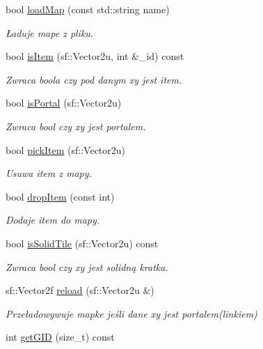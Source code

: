 \begin{DoxyCompactItemize}
\item 
bool \hyperlink{class_tile_map_ac084a4b6aea0e050ec4a8aeea760a515}{load\-Map} (const std\-::string name)
\begin{DoxyCompactList}\small\item\em Ładuje mape z pliku. \end{DoxyCompactList}\item 
bool \hyperlink{class_tile_map_ac5d4d6a3522663052bab1396b1116a89}{is\-Item} (sf\-::\-Vector2u, int \&\-\_\-id) const 
\begin{DoxyCompactList}\small\item\em Zwraca boola czy pod danym xy jest item. \end{DoxyCompactList}\item 
bool \hyperlink{class_tile_map_a9abb261e84ab1ce52d5f2cc6a9c43bbb}{is\-Portal} (sf\-::\-Vector2u)
\begin{DoxyCompactList}\small\item\em Zwraca bool czy xy jest portalem. \end{DoxyCompactList}\item 
bool \hyperlink{class_tile_map_aac072fd241cd09e88a256099055f7238}{pick\-Item} (sf\-::\-Vector2u)
\begin{DoxyCompactList}\small\item\em Usuwa item z mapy. \end{DoxyCompactList}\item 
bool \hyperlink{class_tile_map_ab6b915163f9462171d78d9265332c553}{drop\-Item} (const int)
\begin{DoxyCompactList}\small\item\em Dodaje item do mapy. \end{DoxyCompactList}\item 
bool \hyperlink{class_tile_map_aed48e1dfdf55facc59cbf7e7b60a80d7}{is\-Solid\-Tile} (sf\-::\-Vector2u) const 
\begin{DoxyCompactList}\small\item\em Zwraca bool czy xy jest solidną kratka. \end{DoxyCompactList}\item 
sf\-::\-Vector2f \hyperlink{class_tile_map_a53c335525a76ce71c88404a73573500e}{reload} (sf\-::\-Vector2u \&)
\begin{DoxyCompactList}\small\item\em Przeładowywuje mapke jeśli dane xy jest portalem(linkiem) \end{DoxyCompactList}\item 
int \hyperlink{class_tile_map_a3c64cb00cc8d0e38f7c24e16149fd987}{get\-G\-I\-D} (size\-\_\-t) const 

\end{DoxyCompactItemize}
